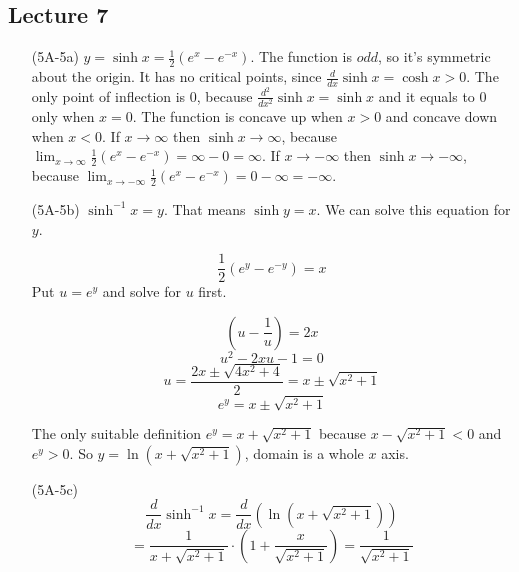 \documentclass{article}
\begin{document}
\subsection{Lecture 7}
\begin{itemize}
    \item[(5A-5a)] $y = \sinh{x} = \frac{1}{2} \left( e^x - e^{-x} \right)$. The function is $odd$, so it's symmetric about the origin. It has no critical points, since $\frac{d}{dx} \sinh{x} = \cosh{x} > 0$. The only point of inflection is $0$, because $\frac{d^2}{dx^2} \sinh{x} = \sinh{x}$ and it equals to $0$ only when $x = 0$. The function is concave up when $x > 0$ and concave down when $x < 0$. If $x \to \infty$ then $\sinh{x} \to \infty$, because $\lim_{x \to \infty} \frac{1}{2} \left( e^x - e^{-x} \right) = \infty - 0 = \infty$. If $x \to -\infty$ then $\sinh{x} \to -\infty$, because $\lim_{x \to -\infty} \frac{1}{2} \left(e^x - e^{-x} \right) = 0 - \infty = -\infty$.

    \begin{figure}[htp!]
    \centering
    
    \label{fig:fig1}
    \end{figure}
    
    \item[(5A-5b)] $\sinh^{-1}{x} = y$. That means $\sinh{y} = x$. We can solve this equation for $y$.

    \[ \frac{1}{2} \left( e^y - e^{-y} \right) = x \]
    Put $u = e^y$ and solve for $u$ first.

    \[ \left( u - \frac{1}{u} \right) = 2x\]
    \[ u^2 - 2xu - 1 = 0\]
    \[ u = \frac{2x \pm \sqrt{4x^2+4}}{2} = x \pm \sqrt{x^2+1} \]
    \[ e^y = x \pm \sqrt{x^2+1} \]

    The only suitable definition  $e^y = x + \sqrt{x^2 + 1}$ because $x - \sqrt{x^2+1} < 0$ and $e^y > 0$. So $y = \ln{\left( x + \sqrt{x^2 + 1} \right)}$, domain is a whole $x$ axis. 

    \begin{figure}[htp!]
    \centering
    
    \label{fig:fig1}
    \end{figure}

    \item[(5A-5c)] 
    \[ \frac{d}{dx} \sinh^{-1}{x} = \frac{d}{dx} \left( \ln{\left( x + \sqrt{x^2 + 1} \right)}  \right) \]
    \[ = \frac{1}{x + \sqrt{x^2 + 1}} \cdot \left( 1 + \frac{x}{\sqrt{x^2+1}} \right) = \frac{1}{\sqrt{x^2+1}} \]

\end{itemize}
\end{document}

